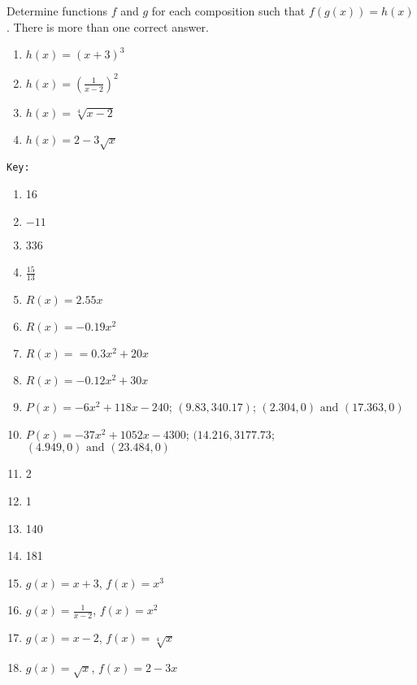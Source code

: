 \documentclass{article}
\newcounter{pset}
\begin{document}
Determine functions $f$ and $g$ for each composition such that $f(g(x)) = h(x)$. There is more than one correct answer.
\begin{multicols}{4}
\begin{enumerate}     \setcounter{enumi}{\value{pset}}
    \item $h(x) = (x+3)^3$
    \item $h(x) = \left(\frac{1}{x-2}\right)^2$
    \item $h(x) = \sqrt[4]{x-2}$
    \item $h(x) = 2 - 3\sqrt{x}$
\end{enumerate}     \setcounter{pset}{\value{enumi}}
\end{multicols}

\newpage 

\texttt{Key:}
\begin{enumerate}
    \item 16
    \item $-11$
    \item 336
    \item $\frac{15}{13}$
    \item $R(x) = 2.55x$
    \item $R(x) = -0.19x^2$
    \item $R(x) = =0.3x^2 + 20x$
    \item $R(x) = -0.12x^2+30x$
    \item $P(x) = -6x^2 + 118x - 240$; $(9.83, 340.17)$; $(2.304,0) \text{ and } (17.363,0)$
    \item $P(x) = -37x^2 + 1052x - 4300$; $(14.216, 3177.73$; $(4.949,0) \text{ and } (23.484,0)$
    \item 2
    \item 1
    \item 140
    \item 181
    \item $g(x) = x+3$, $f(x) = x^3$
    \item $g(x) = \frac{1}{x-2}$, $f(x) = x^2$
    \item $g(x) = x-2$, $f(x) = \sqrt[4]{x}$
    \item $g(x) = \sqrt{x}$, $f(x) = 2-3x$
\end{enumerate}
\end{document}
